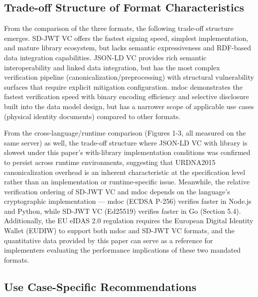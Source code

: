 \documentclass[conference]{IEEEtran}
\begin{document}
\subsection{Trade-off Structure of Format Characteristics}

From the comparison of the three formats, the following trade-off structure emerges. SD-JWT VC offers the fastest signing speed, simplest implementation, and mature library ecosystem, but lacks semantic expressiveness and RDF-based data integration capabilities. JSON-LD VC provides rich semantic interoperability and linked data integration, but has the most complex verification pipeline (canonicalization/preprocessing) with structural vulnerability surfaces that require explicit mitigation configuration. mdoc demonstrates the fastest verification speed with binary encoding efficiency and selective disclosure built into the data model design, but has a narrower scope of applicable use cases (physical identity documents) compared to other formats.

From the cross-language/runtime comparison (Figures 1-3, all measured on the same server) as well, the trade-off structure where JSON-LD VC with library is slowest under this paper's with-library implementation conditions was confirmed to persist across runtime environments, suggesting that URDNA2015 canonicalization overhead is an inherent characteristic at the specification level rather than an implementation or runtime-specific issue. Meanwhile, the relative verification ordering of SD-JWT VC and mdoc depends on the language's cryptographic implementation --- mdoc (ECDSA P-256) verifies faster in Node.js and Python, while SD-JWT VC (Ed25519) verifies faster in Go (Section 5.4). Additionally, the EU eIDAS 2.0 regulation \cite{ref18} requires the European Digital Identity Wallet (EUDIW) to support both mdoc and SD-JWT VC formats, and the quantitative data provided by this paper can serve as a reference for implementers evaluating the performance implications of these two mandated formats.

\subsection{Use Case-Specific Recommendations}
\end{document}
